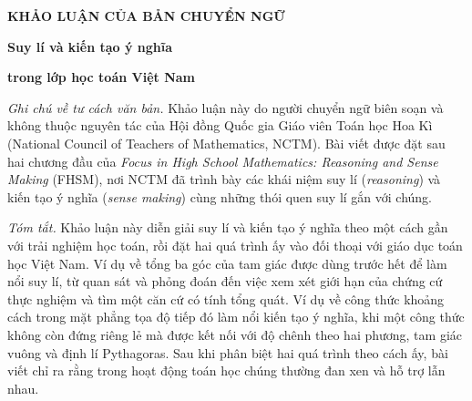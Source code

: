
\cleardoublepage
\gdef\CurrentRunningHead{Suy lí và kiến tạo ý nghĩa}

{}

\begingroup
{}

\thispagestyle{plain}

\begin{center}
{\small\bfseries KHẢO LUẬN CỦA BẢN CHUYỂN NGỮ\par}

\vspace{0.9\baselineskip}

{\Large\bfseries Suy lí và kiến tạo ý nghĩa\par}

\vspace{0.15\baselineskip}

{\Large\bfseries trong lớp học toán Việt Nam\par}
\end{center}

\vspace{1.15\baselineskip}

\begingroup
\small

\noindent
\textit{Ghi chú về tư cách văn bản.}
Khảo luận này do người chuyển ngữ biên soạn và không thuộc nguyên tác của Hội đồng Quốc gia Giáo viên Toán học Hoa Kì (National Council of Teachers of Mathematics, NCTM). Bài viết được đặt sau hai chương đầu của \emph{Focus in High School Mathematics: Reasoning and Sense Making} (FHSM), nơi NCTM đã trình bày các khái niệm suy lí (\emph{reasoning}) và kiến tạo ý nghĩa (\emph{sense making}) cùng những thói quen suy lí gắn với chúng.

\vspace{0.75\baselineskip}

\noindent
\textit{Tóm tắt.}
Khảo luận này diễn giải suy lí và kiến tạo ý nghĩa theo một cách gần với trải nghiệm học toán, rồi đặt hai quá trình ấy vào đối thoại với giáo dục toán học Việt Nam. Ví dụ về tổng ba góc của tam giác được dùng trước hết để làm nổi suy lí, từ quan sát và phỏng đoán đến việc xem xét giới hạn của chứng cứ thực nghiệm và tìm một căn cứ có tính tổng quát. Ví dụ về công thức khoảng cách trong mặt phẳng tọa độ tiếp đó làm nổi kiến tạo ý nghĩa, khi một công thức không còn đứng riêng lẻ mà được kết nối với độ chênh theo hai phương, tam giác vuông và định lí Pythagoras. Sau khi phân biệt hai quá trình theo cách ấy, bài viết chỉ ra rằng trong hoạt động toán học chúng thường đan xen và hỗ trợ lẫn nhau.

